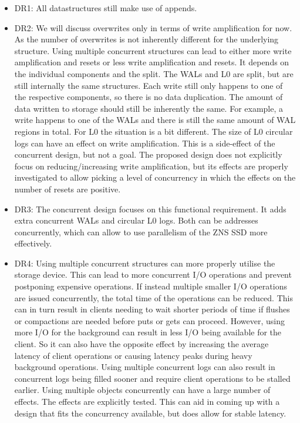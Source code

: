 \begin{itemize}
    \item DR1: All datastructures still make use of appends.
    \item DR2: We will discuss overwrites only in terms of write amplification for now. As the number of overwrites is not inherently different for the underlying structure. Using multiple concurrent structures can lead to either more write amplification and resets or less write amplification and resets. It depends on the individual components and the split. The WALs and L0 are split, but are still internally the same structures. Each write still only happens to one of the respective components, so there is no data duplication. The amount of data written to storage should still be inherently the same. For example, a write happens to one of the WALs and there is still the same amount of WAL regions in total.  For L0 the situation is a bit different. The size of L0 circular logs can have an effect on write amplification. This is a side-effect of the concurrent design, but not a goal. The proposed design does not explicitly focus on reducing/increasing write amplification, but its effects are properly investigated to allow picking a level of concurrency in which the effects on the number of resets are positive.
    \item DR3: The concurrent design focuses on this functional requirement. It adds extra concurrent WALs and circular L0 logs. Both can be addresses concurrently, which can allow to use parallelism of the ZNS SSD more effectively.
    \item DR4: Using multiple concurrent structures can more properly utilise the storage device. This can lead to more concurrent I/O operations and prevent postponing expensive operations. If instead multiple smaller I/O operations are issued concurrently, the total time of the operations can be reduced. This can in turn result in clients needing to wait shorter periods of time if flushes or compactions are needed before puts or gets can proceed. However, using more I/O for the background can result in less I/O being available for the client. So it can also have the opposite effect by increasing the average latency of client operations or causing latency peaks during heavy background operations. Using multiple concurrent logs can also result in concurrent logs being filled sooner and require client operations to be stalled earlier. Using multiple objects concurrently can have a large number of effects. The effects are explicitly tested. This can aid in coming up with a design that fits the concurrency available, but does allow for stable latency.
\end{itemize}

